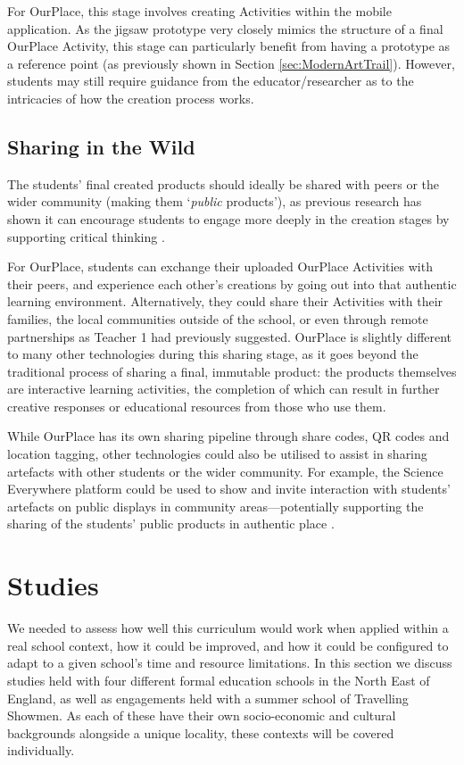 For OurPlace, this stage involves creating Activities within the mobile application. As the jigsaw prototype very closely mimics the structure of a final OurPlace Activity, this stage can particularly benefit from having a prototype as a reference point (as previously shown in Section \ref{sec:ModernArtTrail}). However, students may still require guidance from the educator/researcher as to the intricacies of how the creation process works.

\subsection{Sharing in the Wild}
The students' final created products should ideally be shared with peers or the wider community (making them `\textit{public} products'), as previous research has shown it can encourage students to engage more deeply in the creation stages by supporting critical thinking \citep{Sarangapani2018}. 

For OurPlace, students can exchange their uploaded OurPlace Activities with their peers, and experience each other's creations by going out into that authentic learning environment. Alternatively, they could share their Activities with their families, the local communities outside of the school, or even through remote partnerships as Teacher 1 had previously suggested. OurPlace is slightly different to many other technologies during this sharing stage, as it goes beyond the traditional process of sharing a final, immutable product: the products themselves are interactive learning activities, the completion of which can result in further creative responses or educational resources from those who use them. 

While OurPlace has its own sharing pipeline through share codes, QR codes and location tagging, other technologies could also be utilised to assist in sharing artefacts with other students or the wider community. For example, the Science Everywhere platform could be used to show and invite interaction with students' artefacts on public displays in community areas---potentially supporting the sharing of the students' public products in authentic place \citep{ahn2018}.

\section{Studies}

We needed to assess how well this curriculum would work when applied within a real school context, how it could be improved, and how it could be configured to adapt to a given school's time and resource limitations. In this section we discuss studies held with four different formal education schools in the North East of England, as well as engagements held with a summer school of Travelling Showmen. As each of these have their own socio-economic and cultural backgrounds alongside a unique locality, these contexts will be covered individually.

